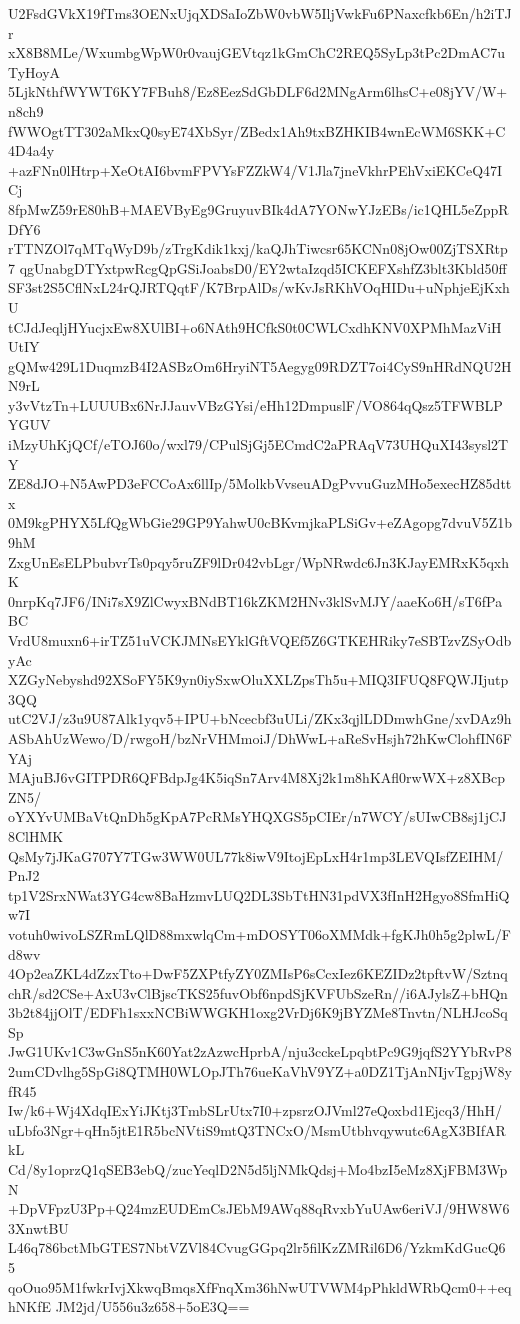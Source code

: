 U2FsdGVkX19fTms3OENxUjqXDSaIoZbW0vbW5IljVwkFu6PNaxcfkb6En/h2iTJr
xX8B8MLe/WxumbgWpW0r0vaujGEVtqz1kGmChC2REQ5SyLp3tPc2DmAC7uTyHoyA
5LjkNthfWYWT6KY7FBuh8/Ez8EezSdGbDLF6d2MNgArm6lhsC+e08jYV/W+n8ch9
fWWOgtTT302aMkxQ0syE74XbSyr/ZBedx1Ah9txBZHKIB4wnEcWM6SKK+C4D4a4y
+azFNn0lHtrp+XeOtAI6bvmFPVYsFZZkW4/V1Jla7jneVkhrPEhVxiEKCeQ47ICj
8fpMwZ59rE80hB+MAEVByEg9GruyuvBIk4dA7YONwYJzEBs/ic1QHL5eZppRDfY6
rTTNZOl7qMTqWyD9b/zTrgKdik1kxj/kaQJhTiwcsr65KCNn08jOw00ZjTSXRtp7
qgUnabgDTYxtpwRcgQpGSiJoabsD0/EY2wtaIzqd5ICKEFXshfZ3blt3Kbld50ff
SF3st2S5CflNxL24rQJRTQqtF/K7BrpAlDs/wKvJsRKhVOqHIDu+uNphjeEjKxhU
tCJdJeqljHYucjxEw8XUlBI+o6NAth9HCfkS0t0CWLCxdhKNV0XPMhMazViHUtIY
gQMw429L1DuqmzB4I2ASBzOm6HryiNT5Aegyg09RDZT7oi4CyS9nHRdNQU2HN9rL
y3vVtzTn+LUUUBx6NrJJauvVBzGYsi/eHh12DmpuslF/VO864qQsz5TFWBLPYGUV
iMzyUhKjQCf/eTOJ60o/wxl79/CPulSjGj5ECmdC2aPRAqV73UHQuXI43sysl2TY
ZE8dJO+N5AwPD3eFCCoAx6llIp/5MolkbVvseuADgPvvuGuzMHo5execHZ85dttx
0M9kgPHYX5LfQgWbGie29GP9YahwU0cBKvmjkaPLSiGv+eZAgopg7dvuV5Z1b9hM
ZxgUnEsELPbubvrTs0pqy5ruZF9lDr042vbLgr/WpNRwdc6Jn3KJayEMRxK5qxhK
0nrpKq7JF6/INi7sX9ZlCwyxBNdBT16kZKM2HNv3klSvMJY/aaeKo6H/sT6fPaBC
VrdU8muxn6+irTZ51uVCKJMNsEYklGftVQEf5Z6GTKEHRiky7eSBTzvZSyOdbyAc
XZGyNebyshd92XSoFY5K9yn0iySxwOluXXLZpsTh5u+MIQ3IFUQ8FQWJIjutp3QQ
utC2VJ/z3u9U87Alk1yqv5+IPU+bNcecbf3uULi/ZKx3qjlLDDmwhGne/xvDAz9h
ASbAhUzWewo/D/rwgoH/bzNrVHMmoiJ/DhWwL+aReSvHsjh72hKwClohfIN6FYAj
MAjuBJ6vGITPDR6QFBdpJg4K5iqSn7Arv4M8Xj2k1m8hKAfl0rwWX+z8XBcpZN5/
oYXYvUMBaVtQnDh5gKpA7PcRMsYHQXGS5pCIEr/n7WCY/sUIwCB8sj1jCJ8ClHMK
QsMy7jJKaG707Y7TGw3WW0UL77k8iwV9ItojEpLxH4r1mp3LEVQIsfZEIHM/PnJ2
tp1V2SrxNWat3YG4cw8BaHzmvLUQ2DL3SbTtHN31pdVX3fInH2Hgyo8SfmHiQw7I
votuh0wivoLSZRmLQlD88mxwlqCm+mDOSYT06oXMMdk+fgKJh0h5g2plwL/Fd8wv
4Op2eaZKL4dZzxTto+DwF5ZXPtfyZY0ZMIsP6sCcxIez6KEZIDz2tpftvW/Sztnq
chR/sd2CSe+AxU3vClBjscTKS25fuvObf6npdSjKVFUbSzeRn//i6AJylsZ+bHQn
3b2t84jjOlT/EDFh1sxxNCBiWWGKH1oxg2VrDj6K9jBYZMe8Tnvtn/NLHJcoSqSp
JwG1UKv1C3wGnS5nK60Yat2zAzwcHprbA/nju3cckeLpqbtPc9G9jqfS2YYbRvP8
2umCDvlhg5SpGi8QTMH0WLOpJTh76ueKaVhV9YZ+a0DZ1TjAnNIjvTgpjW8yfR45
Iw/k6+Wj4XdqIExYiJKtj3TmbSLrUtx7I0+zpsrzOJVml27eQoxbd1Ejcq3/HhH/
uLbfo3Ngr+qHn5jtE1R5bcNVtiS9mtQ3TNCxO/MsmUtbhvqywutc6AgX3BIfARkL
Cd/8y1oprzQ1qSEB3ebQ/zucYeqlD2N5d5ljNMkQdsj+Mo4bzI5eMz8XjFBM3WpN
+DpVFpzU3Pp+Q24mzEUDEmCsJEbM9AWq88qRvxbYuUAw6eriVJ/9HW8W63XnwtBU
L46q786bctMbGTES7NbtVZVl84CvugGGpq2lr5filKzZMRil6D6/YzkmKdGucQ65
qoOuo95M1fwkrIvjXkwqBmqsXfFnqXm36hNwUTVWM4pPhkldWRbQcm0++eqhNKfE
JM2jd/U556u3z658+5oE3Q==
